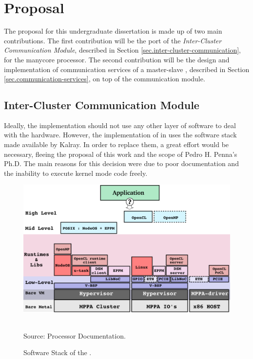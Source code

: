 \chapter{Proposal}
\label{ch.proposal}

The proposal for this undergraduate dissertation is made up of two main contributions.
The first contribution will be the port of the \textit{Inter-Cluster Communication Module},
described in Section \ref{sec.inter-cluster-communication}, for the \mppa manycore processor.
The second contribution will be the design and implementation of communication services
of a master-slave \os, described in Section \ref{sec.communication-services}, on top of
the communication module.

\section{Inter-Cluster Communication Module}

	Ideally, the \hal implementation should not use any other layer of software to
	deal with the hardware. However, the implementation of \hal in \mppa uses the
	software stack made available by Kalray.
	In order to replace them, a great effort would be necessary, fleeing the proposal
	of this work and the scope of Pedro H. Penna's Ph.D.
	The main reasons for this decision were due to poor documentation and the
	inability to execute kernel mode code freely.

	\begin{figure}[t]
		\centering
		\caption{Software Stack of the \mppa.}

		\includegraphics[width=.8\textwidth]{images/software-stack.png}

		\\ \vspace{0.2cm}
		Source: \mppa Processor Documentation.

		\label{fig.software-stack}
	\end{figure}

